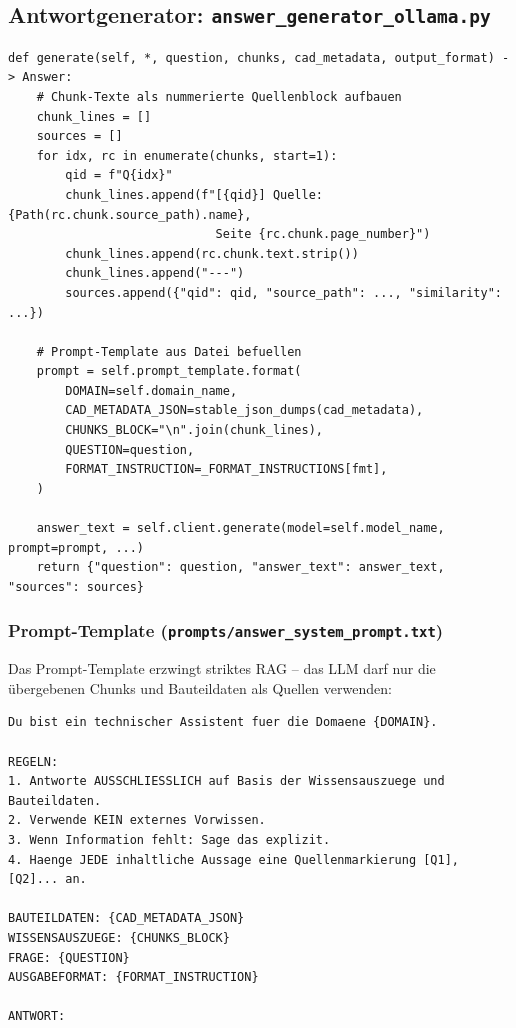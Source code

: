 \documentclass[12pt, a4paper]{article}
\begin{document}
\subsection{Antwortgenerator: \texttt{answer\_generator\_ollama.py}}

\begin{lstlisting}[style=pythonstyle, caption={Prompt-Aufbau und LLM-Aufruf}]
def generate(self, *, question, chunks, cad_metadata, output_format) -> Answer:
    # Chunk-Texte als nummerierte Quellenblock aufbauen
    chunk_lines = []
    sources = []
    for idx, rc in enumerate(chunks, start=1):
        qid = f"Q{idx}"
        chunk_lines.append(f"[{qid}] Quelle: {Path(rc.chunk.source_path).name},
                             Seite {rc.chunk.page_number}")
        chunk_lines.append(rc.chunk.text.strip())
        chunk_lines.append("---")
        sources.append({"qid": qid, "source_path": ..., "similarity": ...})

    # Prompt-Template aus Datei befuellen
    prompt = self.prompt_template.format(
        DOMAIN=self.domain_name,
        CAD_METADATA_JSON=stable_json_dumps(cad_metadata),
        CHUNKS_BLOCK="\n".join(chunk_lines),
        QUESTION=question,
        FORMAT_INSTRUCTION=_FORMAT_INSTRUCTIONS[fmt],
    )

    answer_text = self.client.generate(model=self.model_name, prompt=prompt, ...)
    return {"question": question, "answer_text": answer_text, "sources": sources}
\end{lstlisting}

\subsubsection{Prompt-Template (\texttt{prompts/answer\_system\_prompt.txt})}

Das Prompt-Template erzwingt striktes RAG -- das LLM darf nur die übergebenen
Chunks und Bauteildaten als Quellen verwenden:

\begin{lstlisting}[style=yamlstyle, caption={System-Prompt-Struktur}]
Du bist ein technischer Assistent fuer die Domaene {DOMAIN}.

REGELN:
1. Antworte AUSSCHLIESSLICH auf Basis der Wissensauszuege und Bauteildaten.
2. Verwende KEIN externes Vorwissen.
3. Wenn Information fehlt: Sage das explizit.
4. Haenge JEDE inhaltliche Aussage eine Quellenmarkierung [Q1], [Q2]... an.

BAUTEILDATEN: {CAD_METADATA_JSON}
WISSENSAUSZUEGE: {CHUNKS_BLOCK}
FRAGE: {QUESTION}
AUSGABEFORMAT: {FORMAT_INSTRUCTION}

ANTWORT:
\end{lstlisting}
\end{document}
